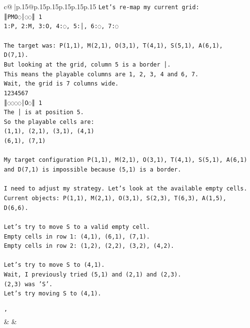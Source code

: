 \documentclass{article}
\begin{document}
{\begin{supertabular}{c@{$\;$}|p{.15\linewidth}@{}p{.15\linewidth}p{.15\linewidth}p{.15\linewidth}p{.15\linewidth}p{.15\linewidth}}
{{{\texttt{Let's re{-}map my current grid:} \\
\texttt{║PMO◌│◌◌║ 1} \\
\texttt{1:P, 2:M, 3:O, 4:◌, 5:│, 6:◌, 7:◌} \\
\\ 
\texttt{The target was: P(1,1), M(2,1), O(3,1), T(4,1), S(5,1), A(6,1), D(7,1).} \\
\texttt{But looking at the grid, column 5 is a border │.} \\
\texttt{This means the playable columns are 1, 2, 3, 4 and 6, 7.} \\
\texttt{Wait, the grid is 7 columns wide.} \\
\texttt{1234567} \\
\texttt{║◌◌◌◌│O◌║ 1} \\
\texttt{The │ is at position 5.} \\
\texttt{So the playable cells are:} \\
\texttt{(1,1), (2,1), (3,1), (4,1)} \\
\texttt{(6,1), (7,1)} \\
\\ 
\texttt{My target configuration P(1,1), M(2,1), O(3,1), T(4,1), S(5,1), A(6,1) and D(7,1) is impossible because (5,1) is a border.} \\
\\ 
\texttt{I need to adjust my strategy. Let's look at the available empty cells.} \\
\texttt{Current objects: P(1,1), M(2,1), O(3,1), S(2,3), T(6,3), A(1,5), D(6,6).} \\
\\ 
\texttt{Let's try to move S to a valid empty cell.} \\
\texttt{Empty cells in row 1: (4,1), (6,1), (7,1).} \\
\texttt{Empty cells in row 2: (1,2), (2,2), (3,2), (4,2).} \\
\\ 
\texttt{Let's try to move S to (4,1).} \\
\texttt{Wait, I previously tried (5,1) and (2,1) and (2,3).} \\
\texttt{(2,3) was 'S'.} \\
\texttt{Let's try moving S to (4,1).} \\
\\ 
\texttt{'} \\
            }
        }
    }
    & & \\ \\


\end{supertabular}}
\end{document}
